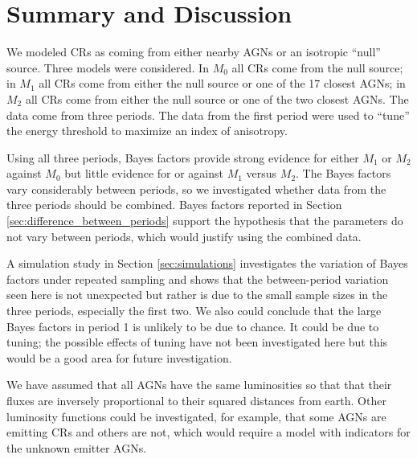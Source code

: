 \section{Summary and Discussion}

We modeled CRs as coming from either nearby AGNs or an isotropic ``null'' source.  Three models were considered.  In $M_0$ all CRs come from the null source; in $M_1$ all CRs come from either the null source or one of the 17 closest AGNs; in $M_2$ all CRs come from either the null source or  one of the two closest AGNs.  The data come from three periods.  The data from the first period were used to ``tune'' the energy threshold to maximize an index of anisotropy.

Using all three periods, Bayes factors provide strong evidence for either $M_1$ or $M_2$ against $M_0$ but little evidence for or against $M_1$ versus $M_2$.  The Bayes factors vary considerably between periods, so we investigated whether data from the three periods should be combined.  Bayes factors reported in Section \ref{sec:difference_between_periods} support the hypothesis that the parameters do not vary between periods, which would justify using the combined data.

A simulation study in Section \ref{sec:simulations} investigates the variation of Bayes factors under repeated sampling and shows that the between-period variation seen here is not unexpected but rather is due to the small sample sizes in the three periods, especially the first two.  We also could conclude that the large Bayes factors in period 1 is unlikely to be due to chance.  It could be due to tuning; the possible effects of tuning have not been investigated here but this would be a good area for future investigation.

We have assumed that all AGNs have the same luminosities so that that their fluxes are inversely proportional to their squared distances from earth.  Other luminosity functions could be investigated, for example, that some AGNs are emitting CRs and others are not, which would require a model with indicators for the unknown emitter AGNs.


